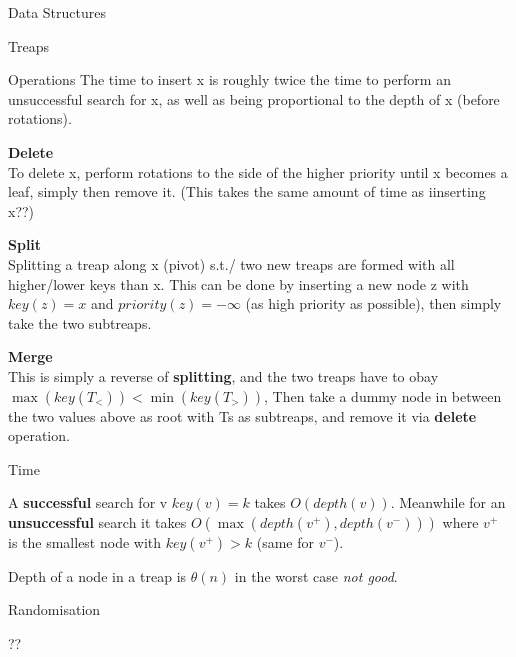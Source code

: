 \documentclass[12pt, letterpaper]{article}
\begin{document}
\begin{section}{Data Structures}
\begin{subsection}{Treaps}
\begin{subsubsection}{Operations}
      The time to insert x is roughly twice the time to perform an unsuccessful
      search for x, as well as being proportional to the depth of x (before
      rotations).

      \textbf{Delete} \\
      To delete x, perform rotations to the side of the higher priority until x
      becomes a leaf, simply then remove it. (This takes the same amount of time
      as iinserting x??)

      \textbf{Split} \\
      Splitting a treap along x (pivot) s.t./ two new treaps are formed with all
      higher/lower keys than x. This can be done by inserting a new node z with
      \(key(z) = x\) and \(priority(z) = -\infty\) (as high priority as
      possible), then simply take the two subtreaps.

      \textbf{Merge} \\
      This is simply a reverse of \textbf{splitting}, and the two treaps have to
      obay \(\max(key(T_{<})) < \min(key(T_{>}))\), Then take a dummy node in
      between the two values above as root with Ts as subtreaps, and remove it
      via \textbf{delete} operation.

    \end{subsubsection}

    \begin{subsubsection}{Time}

      A \textbf{successful} search for v \(key(v) = k\) takes \(O(depth(v))\).
      Meanwhile for an \textbf{unsuccessful} search it takes
      \(O(\max(depth(v^{+}), depth(v^{-})))\) where \(v^{+}\) is the smallest
      node with \(key(v^{+}) > k\) (same for \(v^{-}\)).

      Depth of a node in a treap is \(\theta(n)\) in the worst case \textit{not
        good}.

    \end{subsubsection}

    \begin{subsubsection}{Randomisation}

      ??

    \end{subsubsection}

  \end{subsection}

\end{section}
\end{document}
